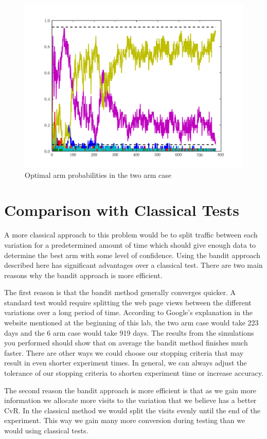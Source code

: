 \begin{figure}\label{fig:weights2}
\begin{center}
        \includegraphics[scale=0.4]{./Applications/MarkDecProc/weights2.pdf}
        \caption{Optimal arm probabilities in the two arm case}
\end{center}
\end{figure}



\section*{Comparison with Classical Tests}
A more classical approach to this problem would be to split traffic between each variation for a predetermined amount of time which should give enough data to determine the best arm with some level of confidence.  Using the bandit approach described here has significant advantages over a classical test.  There are two main reasons why the bandit approach is more efficient.

The first reason is that the bandit method generally converges quicker.  A standard test would require splitting the web page views between the different variations over a long period of time.  According to Google's explanation in the website mentioned at the beginning of this lab, the two arm case would take 223 days and the 6 arm case would take 919 days.  The results from the simulations you performed should show that on average the bandit method finishes much faster.  There are other ways we could choose our stopping criteria that may result in even shorter experiment times.  In general, we can always adjust the tolerance of our stopping criteria to shorten experiment time or increase accuracy.

The second reason the bandit approach is more efficient is that as we gain more information we allocate more visits to the variation that we believe has a better CvR.  In the classical method we would split the visits evenly until the end of the experiment.  This way we gain many more conversion during testing than we would using classical tests.

